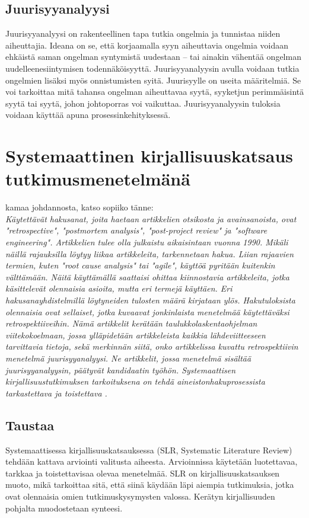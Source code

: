 \subsection{Juurisyyanalyysi}
Juurisyyanalyysi on rakenteellinen tapa tutkia ongelmia ja tunnistaa niiden aiheuttajia. Ideana on se, että korjaamalla syyn aiheuttavia ongelmia voidaan ehkäistä saman ongelman syntymistä uudestaan -- tai ainakin vähentää ongelman uudelleenesiintymisen todennäköisyyttä. \citep{Lehtinen2011} Juurisyyanalyysin avulla voidaan tutkia ongelmien lisäksi myös onnistumisten syitä. \citep{Bjornson2009} Juurisyylle on useita määritelmiä. Se voi tarkoittaa mitä tahansa ongelman aiheuttavaa syytä, syyketjun perimmäisintä syytä tai syytä, johon johtoporras voi vaikuttaa. Juurisyyanalyysin tuloksia voidaan käyttää apuna prosessinkehityksessä. \citep{Lehtinen2011}

\section{Systemaattinen kirjallisuuskatsaus tutkimusmenetelmänä}


kamaa johdannosta, katso sopiiko tänne:\\
\textit{Käytettävät hakusanat, joita haetaan artikkelien otsikosta ja avainsanoista, ovat "retrospective", "postmortem analysis", "post-project review" ja "software engineering". Artikkelien tulee olla julkaistu aikaisintaan vuonna 1990. Mikäli näillä rajauksilla löytyy liikaa artikkeleita, tarkennetaan hakua. Liian rajaavien termien, kuten "root cause analysis" tai "agile", käyttöä pyritään kuitenkin välttämään. Näitä käyttämällä saattaisi ohittaa kiinnostavia artikkeleita, jotka käsittelevät olennaisia asioita, mutta eri termejä käyttäen. Eri hakusanayhdistelmillä löytyneiden tulosten määrä kirjataan ylös.
Hakutuloksista olennaisia ovat sellaiset, jotka kuvaavat jonkinlaista menetelmää käytettäväksi retrospektiiveihin. Nämä artikkelit kerätään taulukkolaskentaohjelman viitekokoelmaan, jossa ylläpidetään artikkeleista kaikkia lähdeviitteeseen tarvittavia tietoja, sekä merkinnän siitä, onko artikkelissa kuvattu retrospektiivin menetelmä juurisyyanalyysi. Ne artikkelit, jossa menetelmä sisältää juurisyyanalyysin, päätyvät kandidaatin työhön. Systemaattisen kirjallisuustutkimuksen tarkoituksena on tehdä aineistonhakuprosessista tarkastettava ja toistettava \citep{Kitchenham2007}.}




\subsection{Taustaa}
Systemaattisessa kirjallisuuskatsauksessa (SLR, Systematic Literature Review) tehdään kattava arviointi valitusta aiheesta. Arvioinnissa käytetään luotettavaa, tarkkaa ja toistettavisaa olevaa menetelmää. SLR on kirjallisuuskatsauksen muoto, mikä tarkoittaa sitä, että siinä käydään läpi aiempia tutkimuksia, jotka ovat olennaisia omien tutkimuskysymysten valossa. Kerätyn kirjallisuuden pohjalta muodostetaan synteesi.\citep{Kitchenham2007}

